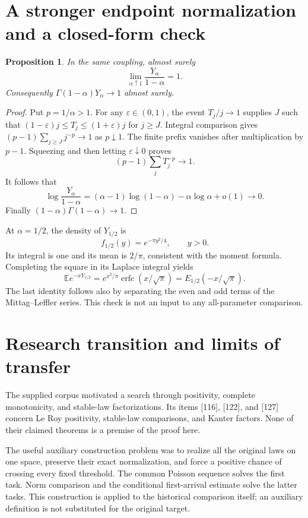 \documentclass[11pt,a4paper]{article}
\newtheorem{proposition}[theorem]{Proposition}
\begin{document}
\section{A stronger endpoint normalization and a closed-form check}
\begin{proposition}\label{prop:endpoint}
In the same coupling, almost surely
\[
\lim_{\alpha\uparrow1}\frac{Y_\alpha}{1-\alpha}=1.
\]
Consequently \(\Gamma(1-\alpha)Y_\alpha\to1\) almost surely.
\end{proposition}
\begin{proof}
Put \(p=1/\alpha>1\). For any \(\varepsilon\in(0,1)\), the event
\(T_j/j\to1\) supplies \(J\) such that
\((1-\varepsilon)j\leq T_j\leq(1+\varepsilon)j\) for \(j\geq J\).
Integral comparison gives
\((p-1)\sum_{j\geq J}j^{-p}\to1\) as \(p\downarrow1\).
The finite prefix vanishes after multiplication by \(p-1\).
Squeezing and then letting \(\varepsilon\downarrow0\) proves
\[
(p-1)\sum_jT_j^{-p}\longrightarrow1.
\]
It follows that
\[
\log\frac{Y_\alpha}{1-\alpha}
=(\alpha-1)\log(1-\alpha)-\alpha\log\alpha+o(1)
\longrightarrow0.
\]
Finally \((1-\alpha)\Gamma(1-\alpha)\to1\).
\end{proof}

At \(\alpha=1/2\), the density of \(Y_{1/2}\) is
\[
f_{1/2}(y)=e^{-\pi y^2/4},\qquad y>0.
\]
Its integral is one and its mean is \(2/\pi\), consistent with the
moment formula. Completing the square in its Laplace integral yields
\[
\mathbb E e^{-xY_{1/2}}
=e^{x^2/\pi}\operatorname{erfc}(x/\sqrt{\pi})
=E_{1/2}(-x/\sqrt{\pi}).
\]
The last identity follows also by separating the even and odd terms
of the Mittag--Leffler series. This check is not an input to any
all-parameter comparison.

\section{Research transition and limits of transfer}
The supplied corpus \cite{Corpus} motivated a search through
positivity, complete monotonicity, and stable-law factorizations.
Its items [116], [122], and [127] concern Le Roy positivity,
stable-law comparisons, and Kanter factors. None of their claimed
theorems is a premise of the proof here.

The useful auxiliary construction problem was to realize all the
original laws on one space, preserve their exact normalization, and
force a positive chance of crossing every fixed threshold. The common
Poisson sequence solves the first task. Norm comparison and the
conditional first-arrival estimate solve the latter tasks. This
construction is applied to the historical comparison itself; an
auxiliary definition is not substituted for the original target.
\end{document}
